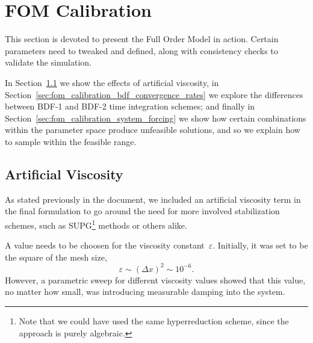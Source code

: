 \documentclass[../../thesis.tex]{subfiles}
\begin{document}
\section{FOM Calibration}
This section is devoted to present the Full Order Model in action.
Certain parameters need to tweaked and defined,
along with consistency checks to validate the simulation.

In Section~\ref{sec:fom_calibration_artificial_viscosity} we show the effects of artificial viscosity,
in Section~\ref{sec:fom_calibration_bdf_convergence_rates} we explore the differences 
between BDF-1 and BDF-2 time integration schemes;
and finally in Section~\ref{sec:fom_calibration_system_forcing} we show how
certain combinations within the parameter space produce unfeasible solutions, 
and so we explain how to sample within the feasible range.

\subsection{Artificial Viscosity}
\label{sec:fom_calibration_artificial_viscosity}
As stated previously in the document, 
we included an artificial viscosity term in the final formulation
to go around the need for more involved stabilization schemes, such as SUPG\footnote{
Note that we could have used the same hyperreduction scheme,
since the approach is purely algebraic.} 
methods or others alike.

A value needs to be choosen for the viscosity constant~$\varepsilon$.
Initially, it was set to be the square of the mesh size, 
\begin{equation*}
    \varepsilon \sim (\Delta x)^2 \sim 10^{-6}.
\end{equation*}
However, a parametric sweep for different viscosity values showed that
this value, 
no matter how small, was introducing measurable damping into the system.
\end{document}
